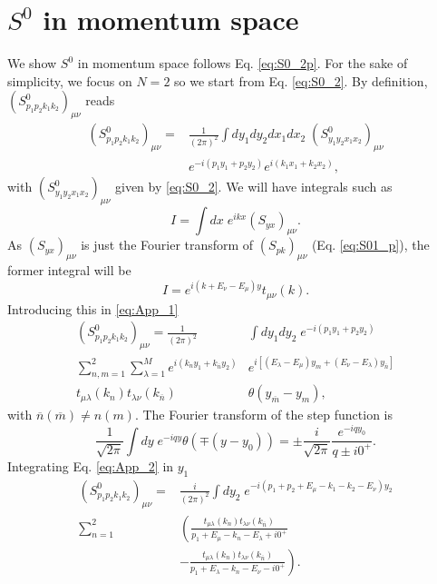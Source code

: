 \documentclass[aps,pra,reprint,amsmath,amssymb]{revtex4-1}
\begin{document}
\section{$S^0$ in momentum space}\label{app:Sp}

We show $S^0$ in momentum space follows Eq. \eqref{eq:S0_2p}. For the sake of simplicity, we focus on $N=2$ so we start from Eq. \eqref{eq:S0_2}. By definition, $(S^0_{p_1p_2k_1k_2})_{\mu\nu}$ reads
\begin{align}\label{eq:App_1}
(S_{p_1p_2k_1k_2}^0)_{\mu\nu}=&\frac{1}{(2\pi)^2}\int  dy_1dy_2dx_1dx_2\; (S_{y_1y_2x_1x_2}^0)_{\mu\nu}\nonumber\\
& e^{-i(p_1y_1+p_2y_2)}  e^{i(k_1x_1+k_2x_2)},
\end{align}
with $(S_{y_1y_2x_1x_2}^0)_{\mu\nu}$ given by \eqref{eq:S0_2}. We will have integrals such as
\begin{equation}
I=\int dx\; e^{ikx}(S_{yx})_{\mu\nu}.
\end{equation}
As $(S_{yx})_{\mu\nu}$ is just the Fourier transform of $(S_{pk})_{\mu\nu}$ (Eq. \eqref{eq:S01_p}), the former integral will be
\begin{equation}
I=e^{i(k+E_\nu-E_\mu)y}t_{\mu\nu}(k).
\end{equation}
Introducing this in \eqref{eq:App_1}
\begin{align}\label{eq:App_2}
(S_{p_1p_2k_1k_2}^0)_{\mu\nu}=\frac{1}{(2\pi)^2} &\int dy_1 dy_2\; e^{-i(p_1y_1+p_2y_2)}\nonumber\\
\sum_{n,m=1}^2 \sum_{\lambda=1}^M e^{i(k_ny_1 + k_{\overline{n}} y_2)}& e^{i[(E_\lambda-E_\mu)y_m+(E_\nu-E_\lambda)y_{\overline{n}}]} \nonumber\\
t_{\mu\lambda}(k_n)t_{\lambda\nu}(k_{\overline{n}})& \theta(y_{\overline{m}}-y_m),
\end{align}
with $\overline{n}(\overline{m})\neq n(m)$. The Fourier transform of the step function is
\begin{equation}
\frac{1}{\sqrt{2\pi}}\int dy \; e^{-iqy}\theta(\mp(y-y_0))=\pm\frac{i}{\sqrt{2\pi}}\frac{e^{-iqy_0}}{q\pm i0^+}.
\end{equation}
Integrating Eq. \eqref{eq:App_2} in $y_1$
\begin{align}
(S_{p_1p_2k_1k_2}^0)_{\mu\nu}=&\frac{i}{(2\pi)^2} \int dy_2\; e^{-i(p_1+p_2+E_\mu-k_1-k_2-E_\nu)y_2} \nonumber\\
\sum_{n=1}^2 & \left( \frac{t_{\mu\lambda}(k_n)t_{\lambda\nu}(k_{\overline{n}})}{p_1+E_\mu-k_n-E_\lambda+i0^+} \right. \nonumber\\
&\left. -\frac{t_{\mu\lambda}(k_n)t_{\lambda\nu}(k_{\overline{n}})}{p_1+E_\lambda-k_n-E_\nu-i0^+}\right).
\end{align}
\end{document}
